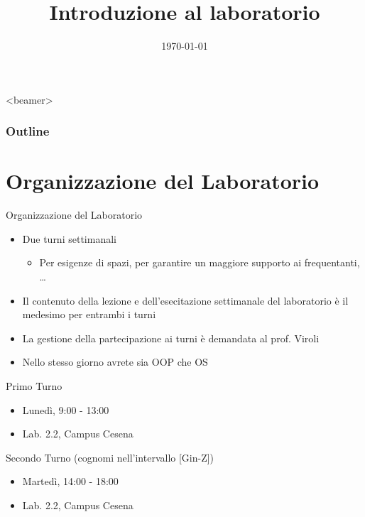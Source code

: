 \documentclass[presentation]{beamer}
\title[{\lab} -- Introduzione]{Introduzione al laboratorio}
\date[\today]{\today}
\begin{document}
\frame[label=coverpage]{\titlepage}

\begin{frame}<beamer>
	\frametitle{Outline}
	\tableofcontents[]
\end{frame}

\section{Organizzazione del Laboratorio}\label{sec:organizzazione-del-laboratorio}

\begin{frame}{Organizzazione del Laboratorio}

\begin{itemize}
    \item Due turni settimanali
    \begin{itemize}
        \item Per esigenze di spazi, per garantire un maggiore supporto ai frequentanti, \dots
    \end{itemize}
    \item Il contenuto della lezione e dell'esecitazione settimanale del laboratorio è il medesimo per entrambi i turni
    \item La gestione della partecipazione ai turni è demandata al prof. Viroli
    \item Nello stesso giorno avrete sia OOP che OS
\end{itemize}

\begin{block}{Primo Turno}
    \begin{itemize}
        \item Lunedì, 9:00 - 13:00
        \item Lab. 2.2, Campus Cesena
    \end{itemize}
\end{block}

\begin{block}{Secondo Turno (cognomi nell'intervallo [Gin-Z])}
\begin{itemize}
\item Martedì, 14:00 - 18:00
\item Lab. 2.2, Campus Cesena
\end{itemize}
\end{block}

\end{frame}
\end{document}
